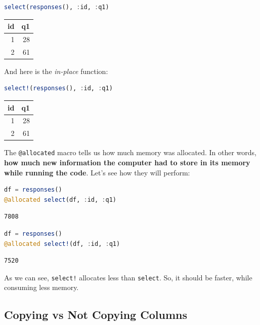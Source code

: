\documentclass[
  notoc %
]{tufte-book}
\newcommand{\passthrough}[1]{#1}
\begin{document}
\begin{lstlisting}[language=Julia]
select(responses(), :id, :q1)
\end{lstlisting}

\begin{longtable}[]{@{}rr@{}}
\toprule
id & q1 \\
\midrule
\endhead
1 & 28 \\
2 & 61 \\
\bottomrule
\end{longtable}

And here is the \emph{in-place} function:

\begin{lstlisting}[language=Julia]
select!(responses(), :id, :q1)
\end{lstlisting}

\begin{longtable}[]{@{}rr@{}}
\toprule
id & q1 \\
\midrule
\endhead
1 & 28 \\
2 & 61 \\
\bottomrule
\end{longtable}

The \passthrough{\lstinline!@allocated!} macro tells us how much memory
was allocated. In other words, \textbf{how much new information the
computer had to store in its memory while running the code}. Let's see
how they will perform:

\begin{lstlisting}[language=Julia]
df = responses()
@allocated select(df, :id, :q1)
\end{lstlisting}

\begin{lstlisting}
7808
\end{lstlisting}

\begin{lstlisting}[language=Julia]
df = responses()
@allocated select!(df, :id, :q1)
\end{lstlisting}

\begin{lstlisting}
7520
\end{lstlisting}

As we can see, \passthrough{\lstinline"select!"} allocates less than
\passthrough{\lstinline!select!}. So, it should be faster, while
consuming less memory.

\hypertarget{sec:df_performance_df_copy}{%
\subsection{Copying vs Not Copying
Columns}\label{sec:df_performance_df_copy}}
\end{document}
